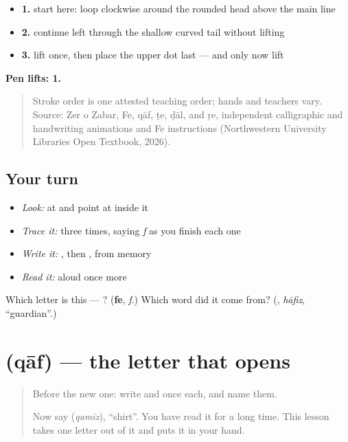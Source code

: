 \begin{itemize}
\raggedright
  \item \textbf{1.} start here: loop clockwise around the rounded head above the main line
  \item \textbf{2.} continue left through the shallow curved tail without lifting
  \item \textbf{3.} lift once, then place the upper dot last — and only now lift
\end{itemize}

\textbf{Pen lifts: 1.}

\begin{quote}
Stroke order is one attested teaching order; hands and teachers vary. Source: Zer o Zabar, Fe, qāf, ṭe, ḍāl, and ṛe, independent  calligraphic and handwriting animations and Fe instructions (Northwestern University Libraries Open Textbook, 2026).
\end{quote}

\subsection*{Your turn}
\begin{itemize}
\raggedright
  \item \emph{Look:} at \textbf{} and point at  inside it
  \item \emph{Trace it:}  three times, saying \emph{f} as you finish each one
  \item \emph{Write it:} , then , from memory
  \item \emph{Read it:} \textbf{} aloud once more
\end{itemize}

\begin{tcolorbox}[breakable,colback=teal!4,colframe=teal!35!black,title={Before you move on}]
Which letter is this — ? (\textbf{fe}, \emph{f}.) Which word did it come from? (\textbf{}, \emph{hāfiz}, \textquotedblleft{}guardian\textquotedblright{}.)
\end{tcolorbox}
\section[\texorpdfstring{\ur{ق} (qāf)}{ق (qāf)}]{ (qāf) — the letter that opens }

\label{lesson:UR-W37-qaf}



\begin{quote}
Before the new one: write  and  once each, and name them.

Now say \textbf{} (\emph{qamīz}), \textquotedblleft{}shirt\textquotedblright{}. You have read it for a long time. This lesson takes one letter out of it and puts it in your hand.
\end{quote}

